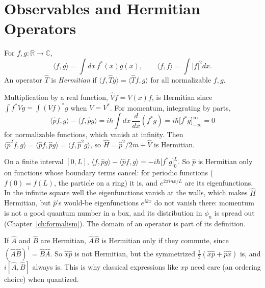 \section{Observables and Hermitian Operators}
\label{sec:hermitian}

\begin{definition}
For $f,g:\mathbb{R}\to\mathbb{C}$,
\[
    \langle f,g\rangle = \int dx\,f^*(x)g(x),
    \qquad
    \langle f,f\rangle = \int|f|^2dx .
\]
An operator $\hat{T}$ is \emph{Hermitian} if $\langle f,\hat{T}g\rangle = \langle\hat{T}f,g\rangle$ for all normalizable $f,g$.
\end{definition}

\begin{example}
Multiplication by a real function, $\hat{V}f = V(x)f$, is Hermitian since $\int f^*Vg = \int(Vf)^*g$ when $V = V^*$. For momentum, integrating by parts,
\[
    \langle\hat{p}f,g\rangle - \langle f,\hat{p}g\rangle = i\hbar\int dx\,\frac{d}{dx}(f^*g) = i\hbar\bigl[f^*g\bigr]_{-\infty}^\infty = 0
\]
for normalizable functions, which vanish at infinity. Then $\langle\hat{p}^2f,g\rangle = \langle\hat{p}f,\hat{p}g\rangle = \langle f,\hat{p}^2g\rangle$, so $\hat{H} = \hat{p}^2/2m + \hat{V}$ is Hermitian.
\end{example}

\begin{example}
On a finite interval $[0,L]$, $\langle f,\hat{p}g\rangle - \langle\hat{p}f,g\rangle = -i\hbar\bigl[f^*g\bigr]_0^L$. So $\hat{p}$ is Hermitian only on functions whose boundary terms cancel: for periodic functions ($f(0) = f(L)$, the particle on a ring) it is, and $e^{2\pi inx/L}$ are its eigenfunctions. In the infinite square well the eigenfunctions vanish at the walls, which makes $\hat{H}$ Hermitian, but $\hat{p}$'s would-be eigenfunctions $e^{ikx}$ do not vanish there: momentum is not a good quantum number in a box, and its distribution in $\phi_n$ is spread out (Chapter~\ref{ch:formalism}). The domain of an operator is part of its definition.
\end{example}

\begin{example}
If $\hat{A}$ and $\hat{B}$ are Hermitian, $\hat{A}\hat{B}$ is Hermitian only if they commute, since $(\hat{A}\hat{B})^\dagger = \hat{B}\hat{A}$. So $\hat{x}\hat{p}$ is not Hermitian, but the symmetrized $\frac12(\hat{x}\hat{p}+\hat{p}\hat{x})$ is, and $i[\hat{A},\hat{B}]$ always is. This is why classical expressions like $xp$ need care (an ordering choice) when quantized.
\end{example}

